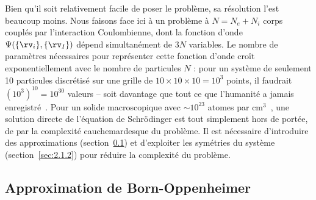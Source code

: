 Bien qu'il soit relativement facile de poser le problème, sa résolution l'est beaucoup moins. Nous faisons face ici à un problème à $N=N_e+N_i$ corps couplés par l'interaction Coulombienne, dont la fonction d'onde $\Psi(\{\rv_i\},\{\rv_I\})$ dépend simultanément de $3N$ variables. Le nombre de paramètres nécessaires pour représenter cette fonction d'onde croît exponentiellement avec le nombre de particules $N$ : pour un système de seulement 10 particules discrétisé sur une grille de $10\times10\times10=10^3$ points, il faudrait $(10^3)^{10}=10^{30}$ valeurs -- soit davantage que tout ce que l'humanité a jamais enregistré~\cite{hilbertWorldsTechnologicalCapacity2011}. Pour un solide macroscopique avec $\sim 10^{23}$ atomes par cm$^3$~\cite{alloulIntroductionPhysicsElectrons2011a}, une solution directe de l'équation de Schrödinger est tout simplement hors de portée, de par la complexité cauchemardesque du problème. Il est nécessaire d'introduire des approximations (section~\ref{sec:2.1.1}) et d'exploiter les symétries du système (section~\ref{sec:2.1.2}) pour réduire la complexité du problème.

\subsection{Approximation de Born-Oppenheimer}\label{sec:2.1.1}

